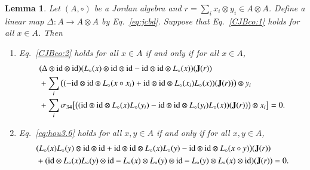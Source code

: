\documentclass[12pt, reqno, a4paper]{amsart}
\newtheorem{lemma}[theorem]{Lemma}
\theoremstyle{definition}
\newcommand{\id}{\mathrm{id}}
\begin{document}
\begin{lemma}\label{lem:sfh}
	Let $(A, \circ)$ be a Jordan algebra and $r = \sum\nolimits_{i} x_i \otimes y_i \in A \otimes A$.
	Define a linear map $\Delta: A \to A \otimes A$ by Eq.~\eqref{eq:jcbd}.
	Suppose that Eq.~\eqref{CJBco:1} holds for all $x \in A$.
	Then
	\begin{enumerate}[label=(\roman*)]
		\item\label{it:hr1}
		    Eq.~\eqref{CJBco:2} holds for all $x \in A$ if and only if for all $x \in A$,
		    \begin{align}
			    & (\Delta \otimes \id \otimes \id)(L_{\circ}(x) \otimes \id \otimes \id - \id \otimes \id \otimes L_{\circ}(x)) (\mathbf{J}(r)) \notag                                                                          \\
			    & + \sum_{i} \big( (-\id \otimes \id \otimes L_{\circ}(x \circ x_i) + \id \otimes \id \otimes L_{\circ}(x_i) L_{\circ}(x)) (\mathbf{J}(r)) \big) \otimes y_i \notag                                             \\
			    & + \sum_{i} \sigma_{34} \bigl[ \big( (\id \otimes \id \otimes L_{\circ}(x) L_{\circ}(y_i) - \id \otimes \id \otimes L_{\circ}(y_i) L_{\circ}(x) ) (\mathbf{J}(r)) \big) \otimes x_i \bigr] = 0. \label{eq:jcs}
		    \end{align}

		\item\label{it:hr2}
		    Eq.~\eqref{eq:hou3.6} holds for all $x, y \in A$ if and only if for all $x,y \in A$,
		    \begin{align}
			    & ( L_{\circ}(x) L_{\circ}(y) \otimes \id \otimes \id + \id \otimes \id \otimes L_{\circ}(x) L_{\circ}(y) - \id \otimes \id \otimes L_{\circ}(x \circ y) \bigr)( \mathbf{J}(r)) \notag        \\
			    & + ( \id \otimes L_{\circ}(x)L_{\circ}(y) \otimes \id - L_{\circ}(x) \otimes L_{\circ}(y) \otimes \id - L_{\circ}(y) \otimes L_{\circ}(x) \otimes \id ) ( \mathbf{J}(r)) = 0. \label{eq:jbcs}
		    \end{align}
	\end{enumerate}
\end{lemma}
\end{document}
